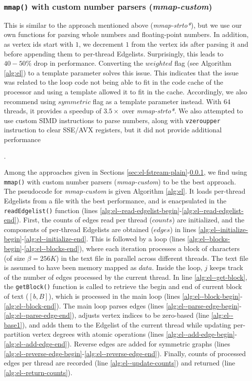 


\subsubsection{\texttt{mmap()} with custom number parsers (\textit{mmap-custom})}
\label{sec:el-mmap-custom}

This is similar to the approach mentioned above (\textit{mmap-strto*}), but we use our own functions for parsing whole numbers and floating-point numbers. In addition, as vertex ids start with $1$, we decrement $1$ from the vertex ids after parsing it and before appending them to per-thread Edgelists. Surprisingly, this leads to $40-50\%$ drop in performance. Converting the $weighted$ flag (see Algorithm \ref{alg:el}) to a template parameter solves this issue. This indicates that the issue was related to the loop code not being able to fit in the code cache of the processor and using a template allowed it to fit in the cache. Accordingly, we also recommend using $symmetric$ flag as a template parameter instead. With 64 threads, it provides a speedup of $3.5\times$ over \textit{mmap-strto*}. We also attempted to use custom SIMD instructions to parse numbers, along with \texttt{vzeroupper} instruction to clear SSE/AVX registers, but it did not provide additional performance.

Among the approaches given in Sections \ref{sec:el-fstream-plain}-\ref{sec:el-mmap-custom}, we find using \texttt{mmap()} with custom number parsers (\textit{mmap-custom}) to be the best approach. The pseudocode for \textit{mmap-custom} is given Algorithm \ref{alg:el}. It loads per-thread Edgelists from a file with the best performance, and is enacpsulated in the \texttt{readEdgelist()} function (lines \ref{alg:el--read-edgelist-begin}-\ref{alg:el--read-edgelist-end}). First, the counts of edges read per thread ($counts$) are initialized, and the components of per-thread Edgelists are obtained ($edges$) in lines \ref{alg:el--initialize-begin}-\ref{alg:el--initialize-end}. This is followed by a loop (lines \ref{alg:el--blocks-begin}-\ref{alg:el--blocks-end}), where each iteration processes a block of characters (of size $\beta = 256K$) in the text file in parallel across different threads. The text file is assumed to have been memory mapped as $data$. Inside the loop, $j$ keeps track of the number of edges processed by the current thread. In line \ref{alg:el--get-block}, the \texttt{getBlock()} function is called to retrieve the begin and end of current block of text ($[b, B]$), which is processed in the main loop (lines \ref{alg:el--block-begin}-\ref{alg:el--block-end}). The main loop parses edges (lines \ref{alg:el--parse-edge-begin}-\ref{alg:el--parse-edge-end}), adjusts vertex indices to be zero-based (line \ref{alg:el--base1}), and adds them to the Edgelist of the current thread while updating per-partition vertex degrees with atomic operations (lines \ref{alg:el--add-edge-begin}-\ref{alg:el--add-edge-end}). Reverse edges are added for symmetric graphs (lines \ref{alg:el--reverse-edge-begin}-\ref{alg:el--reverse-edge-end}). Finally, counts of processed edges per thread are recorded (line \ref{alg:el--update-counts}) and returned (line \ref{alg:el--return-counts}).

